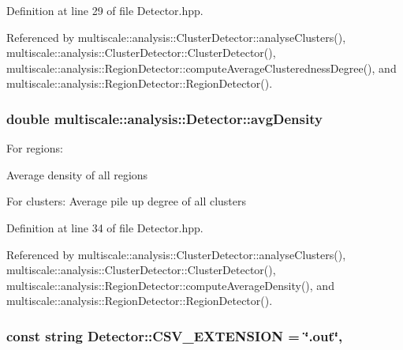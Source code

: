 Definition at line 29 of file Detector.\-hpp.



Referenced by multiscale\-::analysis\-::\-Cluster\-Detector\-::analyse\-Clusters(), multiscale\-::analysis\-::\-Cluster\-Detector\-::\-Cluster\-Detector(), multiscale\-::analysis\-::\-Region\-Detector\-::compute\-Average\-Clusteredness\-Degree(), and multiscale\-::analysis\-::\-Region\-Detector\-::\-Region\-Detector().

\hypertarget{classmultiscale_1_1analysis_1_1Detector_a411629d4cf34809127662d625ba057c0}{
\subsubsection[{avg\-Density}]{\setlength{\rightskip}{0pt plus 5cm}double multiscale\-::analysis\-::\-Detector\-::avg\-Density\hspace{0.3cm}{\ttfamily [protected]}}}\label{classmultiscale_1_1analysis_1_1Detector_a411629d4cf34809127662d625ba057c0}
\begin{DoxyVerb}                  For regions:
\end{DoxyVerb}
 Average density of all regions

For clusters\-: Average pile up degree of all clusters 

Definition at line 34 of file Detector.\-hpp.



Referenced by multiscale\-::analysis\-::\-Cluster\-Detector\-::analyse\-Clusters(), multiscale\-::analysis\-::\-Cluster\-Detector\-::\-Cluster\-Detector(), multiscale\-::analysis\-::\-Region\-Detector\-::compute\-Average\-Density(), and multiscale\-::analysis\-::\-Region\-Detector\-::\-Region\-Detector().

\hypertarget{classmultiscale_1_1analysis_1_1Detector_a5458417daa8430ea8ebbe1c25cb26f41}{
\subsubsection[{C\-S\-V\-\_\-\-E\-X\-T\-E\-N\-S\-I\-O\-N}]{\setlength{\rightskip}{0pt plus 5cm}const string Detector\-::\-C\-S\-V\-\_\-\-E\-X\-T\-E\-N\-S\-I\-O\-N = \char`\"{}.out\char`\"{}\hspace{0.3cm}{\ttfamily [static]}, {\ttfamily [protected]}}}\label{classmultiscale_1_1analysis_1_1Detector_a5458417daa8430ea8ebbe1c25cb26f41}


